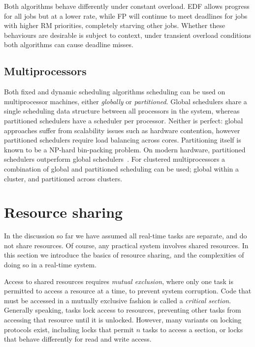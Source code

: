 Both algorithms behave differently under constant
overload. \gls{EDF} allows progress for all jobs but at a lower rate, while \gls{FP} will
continue to meet deadlines for jobs with higher \gls{RM} priorities, completely starving other
jobs. Whether these behaviours are desirable is subject to context, under
transient overload conditions both algorithms can cause deadline misses.


\subsection{Multiprocessors}

Both fixed and dynamic scheduling algorithms scheduling can be used on multiprocessor machines, either
\emph{globally} or \emph{partitioned}. Global schedulers share a single scheduling data structure
between all processors in the system, whereas partitioned schedulers have a scheduler per processor.
Neither is perfect: global approaches suffer from scalability issues such as hardware contention,
however partitioned schedulers require load balancing across cores.  Partitioning itself is known to
be a NP-hard bin-packing problem.  On modern hardware, partitioned schedulers outperform global
schedulers~\citep{Brandenburg:phd}.  For clustered multiprocessors a combination of global and
partitioned scheduling can be used; global within a cluster, and partitioned across clusters.

\section{Resource sharing}
\label{sec:resource-sharing-theory}

In the discussion so far we have assumed all real-time tasks are separate, and do not share resources.
Of course, any practical system involves shared resources. In this section we introduce the basics
of resource sharing, and the complexities of doing so in a real-time system.

Access to shared resources requires \emph{mutual exclusion}, where only one 
task is permitted to access a resource at a time, to prevent system corruption. Code that
must be accessed in a mutually exclusive fashion is called a \emph{critical section}. Generally
speaking, tasks lock access to resources, preventing other tasks from accessing that resource
until it is unlocked. However, many variants on locking protocols exist, including locks that permit
$n$ tasks to access a section, or locks that behave differently for read and write access.

